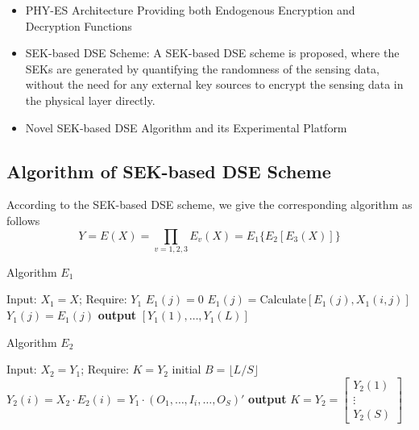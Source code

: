 \documentclass[a4paper]{article}
\begin{document}
\begin{itemize}
  \item PHY-ES Architecture Providing both Endogenous Encryption and Decryption Functions
  \item   SEK-based DSE Scheme: A SEK-based DSE scheme is proposed, where the SEKs are generated by quantifying the randomness of the sensing data, without the need for any external key sources to encrypt the sensing data in the physical layer directly.
  \item Novel SEK-based DSE Algorithm and its Experimental Platform
\end{itemize}

\subsection{Algorithm of SEK-based DSE Scheme}

According to the SEK-based DSE scheme, we give the corresponding algorithm as follows
\begin{equation}
  Y = E(X) = \prod_{v=1,2,3} E_v(X) = E_1\{E_2[E_3(X)]\}
\end{equation}

\begin{algorithm}
  \caption{Algorithm $E_1$}
  \begin{algorithmic}[1]
    \REQUIRE Input: $X_1=X$; Require: $Y_1$
    \STATE $E_1(j) = 0$
    \STATE $E_1(j) = \text{Calculate}[E_1(j), X_1(i,j)]$
    \ENDFOR
    \STATE $Y_1(j) = E_1(j)$
    \ENDFOR
    \STATE \textbf{output} $[Y_1(1), \ldots, Y_1(L)]$
  \end{algorithmic}
\end{algorithm}

\begin{algorithm}
  \caption{Algorithm $E_2$}
  \begin{algorithmic}[1]
    \REQUIRE Input: $X_2=Y_1$; Require: $K = Y_2$
    \STATE initial $B = \lfloor L/S \rfloor$
    \STATE $Y_2(i) = X_2 \cdot E_2(i) = Y_1 \cdot (O_1, \ldots, I_i, \ldots, O_S)'$
    \ENDFOR
    \STATE \textbf{output} $K = Y_2 =
    \begin{bmatrix}
      Y_2(1) \\
      \vdots \\
      Y_2(S)
    \end{bmatrix}$
  \end{algorithmic}
\end{algorithm}
\end{document}
